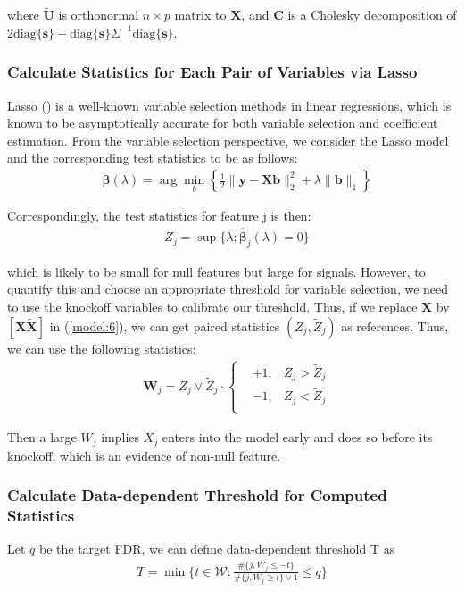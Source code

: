 \documentclass{uwstat572}
\newcommand\diag{\text{diag}}
\begin{document}
where $\tilde{\bm{U}}$ is orthonormal $n\times p$ matrix to $\bm{X}$, and $\bm{C}$ is a Cholesky decomposition of $2\diag\{\bm{s}\} - \diag\{\bm{s}\} \Sigma^{-1} \diag\{\bm{s}\}$.

\subsubsection{Calculate Statistics for Each Pair of Variables via Lasso}
Lasso (\cite{tibshirani1996regression}) is a well-known variable selection methods in linear regressions, which is known to be asymptotically accurate for both variable selection and coefficient estimation. From the variable selection perspective, we consider the Lasso model and the corresponding test statistics to be as follows:
\begin{align}\label{model:6}
& \hat{\bm{\beta}}(\lambda) = \arg\min_b \left\{\frac{1}{2}\|\bm{y} - \bm{X}\bm{b} \|_2^2 + \lambda\|\bm{b}\|_1 \right\}
\end{align}

Correspondingly, the test statistics for feature j is then:
\begin{align}
& Z_j = \sup\{\lambda; \hat{\bm{\beta}}_j(\lambda)=0 \}
\end{align}

which is likely to be small for null features but large for signals.
However, to quantify this and choose an appropriate threshold for variable selection, we need to use the knockoff variables to calibrate our threshold. Thus, if we replace $\bm{X}$ by $[\bm{X} \bm{\tilde{X}}]$ in (\ref{model:6}), we can get paired statistics $(Z_j, \tilde{Z}_j)$ as references. Thus, we can use the following statistics:
\begin{align}\label{eq:8}
& \bm{W}_j = Z_j\vee \tilde{Z}_j \cdot \left\{\begin{aligned}
& +1, & 	Z_j > \tilde{Z}_j\\ & -1, & 	Z_j < \tilde{Z}_j\\ 
\end{aligned} \right.
\end{align}

Then a large $W_j$ implies $X_j$ enters into the model early and does so before its knockoff, which is an evidence of non-null feature.

\subsubsection{Calculate Data-dependent Threshold for Computed Statistics}
Let $q$ be the target FDR, we can define data-dependent threshold T as 
\begin{align}\label{eq:9}
T  = \min\{t\in\mathcal{W}: \frac{\#\{j, W_j\leq -t\}}{\#\{j, W_j\geq t\}\vee 1}\leq q \}
\end{align}
\end{document}

